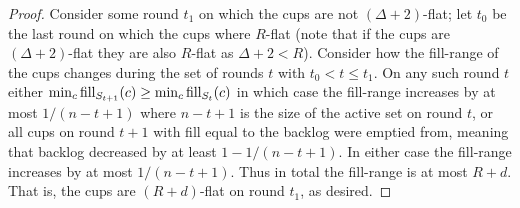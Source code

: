 \begin{proof}
  Consider some round $t_1$ on which the cups are not $(\Delta +
  2)$-flat; let $t_0$ be the last round on which the cups where
  $R$-flat (note that if the cups are $(\Delta+2)$-flat they are
  also $R$-flat as $\Delta + 2 < R$). Consider how the fill-range
  of the cups changes during the set of rounds
  $t$ with $t_0 < t \le t_1$. On any such round $t$ either $\min_c
  \operatorname{\textnormal{fill}}_{S_{t+1}}(c) \ge \min_c \operatorname{\textnormal{fill}}_{S_{t}}(c)$ in which case the
  fill-range increases by at most $1/(n-t+1)$ where $n-t+1$ is the
  size of the active set on round $t$, or all cups on round $t+1$
  with fill equal to the backlog were emptied from, meaning that
  backlog decreased by at least $1-1/(n-t+1)$. In either case the
  fill-range increases by at most $1/(n-t+1)$. Thus in total the
  fill-range is at most $R + d$. That is, the cups are
  $(R+d)$-flat on round $t_1$, as desired.

\end{proof}
